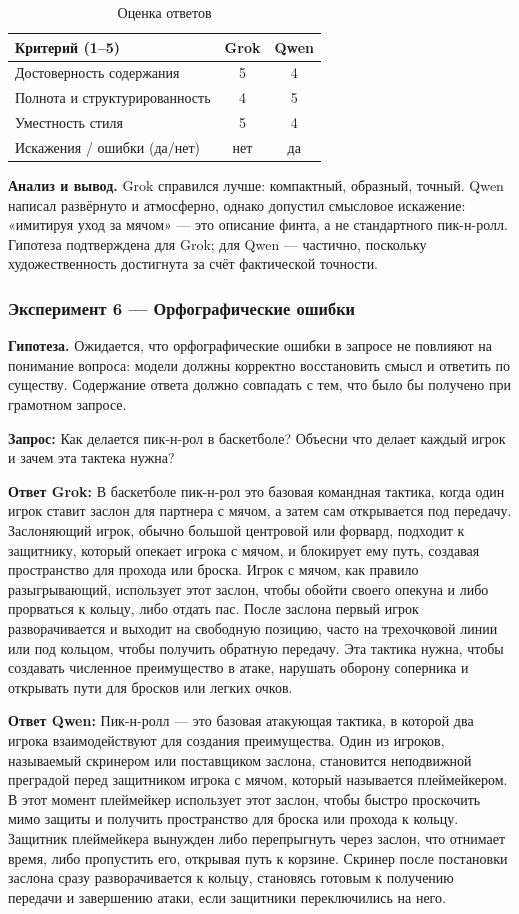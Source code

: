 \documentclass[a4paper, final]{article}
\newcommand{\scoretablefilled}[8]{%
    \vspace{4pt}
    \begin{table}[h!]
    \centering
    \small
    \begin{tabular}{|l|c|c|}
    \hline
    \textbf{Критерий (1--5)} & \textbf{Grok} & \textbf{Qwen} \\
    \hline
    Достоверность содержания & #1 & #2 \\
    \hline
    Полнота и структурированность & #3 & #4 \\
    \hline
    Уместность стиля & #5 & #6 \\
    \hline
    Искажения / ошибки (да/нет) & #7 & #8 \\
    \hline
    \end{tabular}
    \caption{Оценка ответов}
    \end{table}
    \vspace{2pt}
}
\begin{document}
\scoretablefilled{5}{4}{4}{5}{5}{4}{нет}{да}

\noindent\textbf{Анализ и вывод.} Grok справился лучше: компактный, образный, точный. Qwen написал развёрнуто и атмосферно, однако допустил смысловое искажение: «имитируя уход за мячом» — это описание финта, а не стандартного пик-н-ролл. Гипотеза подтверждена для Grok; для Qwen — частично, поскольку художественность достигнута за счёт фактической точности.

\newpage

\subsubsection{Эксперимент 6 — Орфографические ошибки}

\noindent\textbf{Гипотеза.} Ожидается, что орфографические ошибки в запросе не повлияют на понимание вопроса: модели должны корректно восстановить смысл и ответить по существу. Содержание ответа должно совпадать с тем, что было бы получено при грамотном запросе.

\noindent\textbf{Запрос:} Как делается пик-н-рол в баскетболе? Объесни что делает каждый игрок и зачем эта тактека нужна?

\noindent\textbf{Ответ Grok:} В баскетболе пик-н-рол это базовая командная тактика, когда один игрок ставит заслон для партнера с мячом, а затем сам открывается под передачу. Заслоняющий игрок, обычно большой центровой или форвард, подходит к защитнику, который опекает игрока с мячом, и блокирует ему путь, создавая пространство для прохода или броска. Игрок с мячом, как правило разыгрывающий, использует этот заслон, чтобы обойти своего опекуна и либо прорваться к кольцу, либо отдать пас. После заслона первый игрок разворачивается и выходит на свободную позицию, часто на трехочковой линии или под кольцом, чтобы получить обратную передачу. Эта тактика нужна, чтобы создавать численное преимущество в атаке, нарушать оборону соперника и открывать пути для бросков или легких очков.

\noindent\textbf{Ответ Qwen:} Пик-н-ролл — это базовая атакующая тактика, в которой два игрока взаимодействуют для создания преимущества. Один из игроков, называемый скринером или поставщиком заслона, становится неподвижной преградой перед защитником игрока с мячом, который называется плеймейкером. В этот момент плеймейкер использует этот заслон, чтобы быстро проскочить мимо защиты и получить пространство для броска или прохода к кольцу. Защитник плеймейкера вынужден либо перепрыгнуть через заслон, что отнимает время, либо пропустить его, открывая путь к корзине. Скринер после постановки заслона сразу разворачивается к кольцу, становясь готовым к получению передачи и завершению атаки, если защитники переключились на него.
\end{document}
